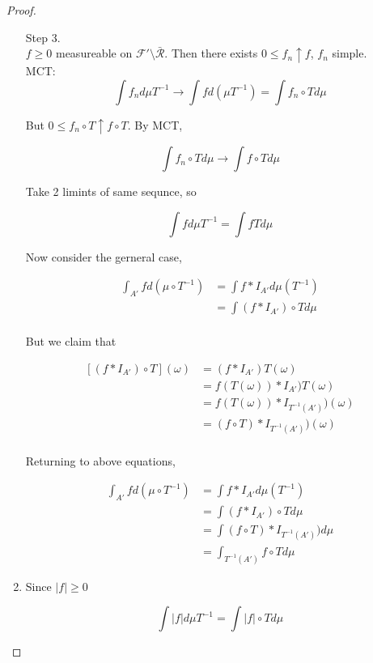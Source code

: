 \documentclass[11pt,fleqn]{book} %
\begin{document}
\begin{proof}
\begin{enumerate}
			Step 3. \\

			$f \geq 0$ measureable on $\mathcal{F'}\setminus \bar{\mathcal{R}}$. Then there exists $ 0 \leq f_n \uparrow f$, $f_n$ simple. \\

			MCT: \\
					$$\int f_n d\mu T^{-1} \rightarrow \int f d(\mu T^{-1}) = \int f_n \circ T d\mu$$

			But $0 \leq f_n \circ T \uparrow f \circ T$. By MCT, 

					$$\int f_n \circ T d\mu \rightarrow \int f \circ T d\mu $$

			Take 2 limints of same sequnce, so 

					$$\int f d \mu T^{-1} = \int f T d\mu $$

			Now consider the gerneral case, 

					$$\begin{aligned}
							\int_{A'} f d(\mu \circ T^{-1}) &= \int f * I_{A'} d \mu(T^{-1})\\
								&=	\int (f * I_{A'}) \circ T d\mu\\
					\end{aligned}$$	

			But we claim that 

					$$\begin{aligned}
						[(f * I_{A'}) \circ T](\omega) &= (f * I_{A'}) T(\omega)\\
								&= f(T(\omega)) * I_{A'}) T(\omega)\\
								&= f(T(\omega)) * I_{T^{-1}(A')})(\omega)\\
								&= (f \circ T) * I_{T^{-1}(A')})(\omega)\\
					\end{aligned} $$

		Returning to above equations, 

			$$\begin{aligned}
				\int_{A'} f d(\mu \circ T^{-1}) &= \int f * I_{A'} d \mu(T^{-1})\\
					&=	\int (f * I_{A'}) \circ T d\mu\\
					&= \int (f \circ T) * I_{T^{-1}(A')}) d\mu\\
					&= \int_{T^{-1}(A')} f \circ T d\mu
			\end{aligned}$$	

	\item Since $|f| \geq 0$

			$$\int |f| d\mu T^{-1} = \int |f| \circ T d\mu $$


\end{enumerate}
\end{proof}
\end{document}
